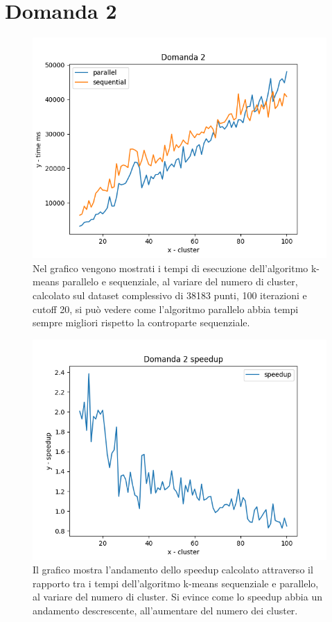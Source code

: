 \documentclass{article}
\begin{document}
\vspace{-3cm}
\section*{Domanda 2}
\begin{center}
	\begin{figure}[H]
		\hspace*{1.5cm}\includegraphics[width=0.7\linewidth, valign=t]{figures/domanda2}
		\caption*{Nel grafico vengono mostrati i tempi di esecuzione dell'algoritmo k-means parallelo e sequenziale, al variare del numero di cluster, calcolato sul dataset complessivo di 38183 punti, 100 iterazioni e cutoff 20, si può vedere come l'algoritmo parallelo abbia tempi sempre migliori rispetto la controparte sequenziale.}
	\end{figure}
\end{center}

\begin{center}
	\begin{figure}[H]
		\hspace*{1.5cm}\includegraphics[width=0.7\linewidth, valign=t]{figures/domanda2speedup}
		\caption*{Il grafico mostra l'andamento dello speedup calcolato attraverso il rapporto tra i tempi dell'algoritmo k-means sequenziale e parallelo, al variare del numero di cluster. Si evince come lo speedup abbia un andamento descrescente, all'aumentare del numero dei cluster.}
	\end{figure}
\end{center}
\end{document}
